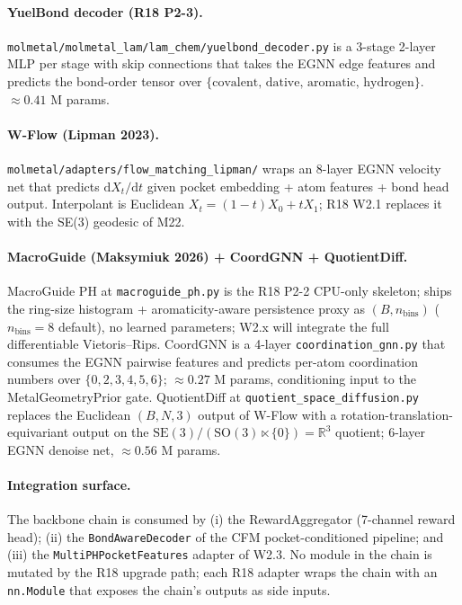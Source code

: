 \paragraph{YuelBond decoder (R18 P2-3).}
\texttt{molmetal/molmetal\_lam/lam\_chem/yuelbond\_decoder.py} is
a 3-stage 2-layer MLP per stage with skip connections that takes
the EGNN edge features and predicts the bond-order tensor over
$\{\text{covalent, dative, aromatic, hydrogen}\}$.  $\approx 0.41$
M params.

\paragraph{W-Flow (Lipman 2023).}
\texttt{molmetal/adapters/flow\_matching\_lipman/} wraps an 8-layer
EGNN velocity net that predicts $\mathrm{d} X_{t} / \mathrm{d} t$
given pocket embedding + atom features + bond head output.
Interpolant is Euclidean $X_{t} = (1 - t) X_{0} + t X_{1}$; R18
W2.1 replaces it with the SE(3) geodesic of M22.

\paragraph{MacroGuide (Maksymiuk 2026) + CoordGNN + QuotientDiff.}
MacroGuide PH at \texttt{macroguide\_ph.py} is the R18 P2-2
CPU-only skeleton; ships the ring-size histogram +
aromaticity-aware persistence proxy as $(B, n_{\mathrm{bins}})$
($n_{\mathrm{bins}} = 8$ default), no learned parameters; W2.x
will integrate the full differentiable Vietoris--Rips.  CoordGNN
is a 4-layer \texttt{coordination\_gnn.py} that consumes the EGNN
pairwise features and predicts per-atom coordination numbers over
$\{0, 2, 3, 4, 5, 6\}$; $\approx 0.27$ M params, conditioning
input to the MetalGeometryPrior gate.  QuotientDiff at
\texttt{quotient\_space\_diffusion.py} replaces the Euclidean
$(B, N, 3)$ output of W-Flow with a rotation-translation-
equivariant output on the $\mathrm{SE}(3) / (\mathrm{SO}(3)
\ltimes \{0\}) = \mathbb{R}^{3}$ quotient; 6-layer EGNN denoise
net, $\approx 0.56$ M params.

\paragraph{Integration surface.}
The backbone chain is consumed by (i) the RewardAggregator
(7-channel reward head); (ii) the \texttt{BondAwareDecoder} of
the CFM pocket-conditioned pipeline; and (iii) the
\texttt{MultiPHPocketFeatures} adapter of W2.3.  No module in the
chain is mutated by the R18 upgrade path; each R18 adapter wraps
the chain with an \texttt{nn.Module} that exposes the chain's
outputs as side inputs.

